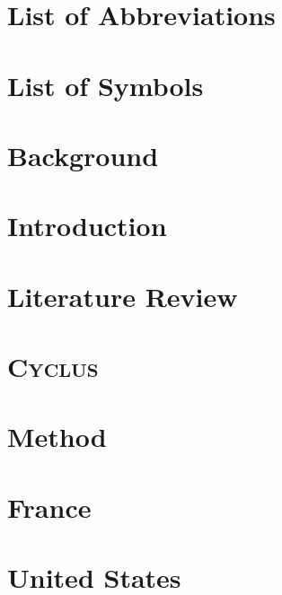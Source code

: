 \documentclass{report}
\newcommand{\Cyclus}{\textsc{Cyclus}\xspace}%
\begin{document}
\chapter{List of Abbreviations}
\printglossaries
\chapter{List of Symbols}


\pagebreak

\chapter{Background}


\chapter{Introduction}


\chapter{Literature Review}


\chapter{\Cyclus}


\chapter{Method}


\FloatBarrier


\chapter{France}



\chapter{United States}







\end{document}
